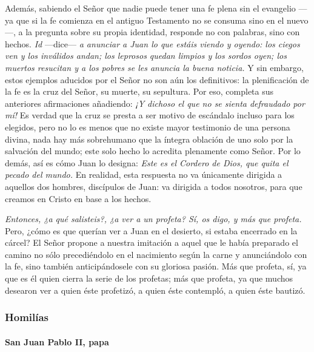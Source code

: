 \documentclass[]{article}
\let\oldparagraph\paragraph
\renewcommand{\paragraph}[1]{\oldparagraph{#1}\mbox{}}
\begin{document}
Además, sabiendo el Señor que nadie puede tener una fe plena sin el
evangelio ---ya que si la fe comienza en el antiguo Testamento no se
consuma sino en el nuevo---, a la pregunta sobre su propia identidad,
responde no con palabras, sino con hechos. \emph{Id} ---dice--- \emph{a
anunciar a Juan lo que estáis viendo y oyendo: los ciegos ven y los
inválidos andan; los leprosos quedan limpios y los sordos oyen; los
muertos resucitan y a los pobres se les anuncia la buena noticia.} Y sin
embargo, estos ejemplos aducidos por el Señor no son aún los
definitivos: la plenificación de la fe es la cruz del Señor, su muerte,
su sepultura. Por eso, completa sus anteriores afirmaciones añadiendo:
\emph{¡Y dichoso el que no se sienta defraudado por mí!} Es verdad que
la cruz se presta a ser motivo de escándalo incluso para los elegidos,
pero no lo es menos que no existe mayor testimonio de una persona
divina, nada hay más sobrehumano que la íntegra oblación de uno solo por
la salvación del mundo; este solo hecho lo acredita plenamente como
Señor. Por lo demás, así es cómo Juan lo designa: \emph{Este es el
Cordero de Dios, que quita el pecado del mundo.} En realidad, esta
respuesta no va únicamente dirigida a aquellos dos hombres, discípulos
de Juan: va dirigida a todos nosotros, para que creamos en Cristo en
base a los hechos.

\emph{Entonces, ¿a qué salisteis?, ¿a ver a un profeta? Sí, os digo, y
más que profeta.} Pero, ¿cómo es que querían ver a Juan en el desierto,
si estaba encerrado en la cárcel? El Señor propone a nuestra imitación a
aquel que le había preparado el camino no sólo precediéndolo en el
nacimiento según la carne y anunciándolo con la fe, sino también
anticipándosele con su gloriosa pasión. Más que profeta, sí, ya que es
él quien cierra la serie de los profetas; más que profeta, ya que muchos
desearon ver a quien éste profetizó, a quien éste contempló, a quien
éste bautizó.

\protect\hypertarget{_Toc448662737}{}{\protect\hypertarget{_Toc448690256}{}{}}

\subsubsection{Homilías}\label{homiluxedas-2}

\paragraph{San Juan Pablo II, papa}\label{san-juan-pablo-ii-papa-2}
\end{document}

